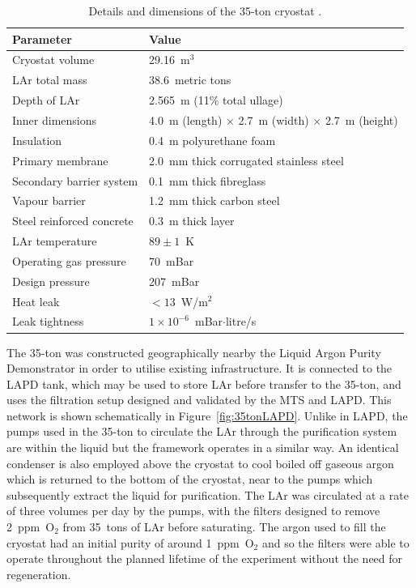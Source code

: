 \begin{table}
  \caption[Details and dimensions of the 35-ton cryostat.]{Details and dimensions of the 35-ton cryostat \cite{35tonPhaseI2015}.}
  \label{tab:35tonCryostat}
  \centering
  \begin{tabular}{ l l }
    \toprule
    Parameter & Value \\
    \midrule
    Cryostat volume           & 29.16~m$^3$ \\
    LAr total mass            & 38.6~metric tons \\
    Depth of LAr              & 2.565~m (11\% total ullage) \\
    Inner dimensions          & 4.0~m (length) $\times$ 2.7~m (width) $\times$ 2.7~m (height) \\
    Insulation                & 0.4~m polyurethane foam \\
    Primary membrane          & 2.0~mm thick corrugated stainless steel \\
    Secondary barrier system  & 0.1~mm thick fibreglass \\
    Vapour barrier             & 1.2~mm thick carbon steel \\
    Steel reinforced concrete & 0.3~m thick layer \\
    LAr temperature           & $89\pm1$~K \\
    Operating gas pressure    & 70~mBar \\
    Design pressure           & 207~mBar \\
    Heat leak                 & $<13$~W/m$^2$ \\
    Leak tightness            & $1\times10^{-6}$~mBar$\cdot$litre/s \\
    \bottomrule
  \end{tabular}
\end{table}

The 35-ton was constructed geographically nearby the Liquid Argon Purity Demonstrator in order to utilise existing infrastructure.  It is connected to the LAPD tank, which may be used to store LAr before transfer to the 35-ton, and uses the filtration setup designed and validated by the MTS and LAPD.  This network is shown schematically in Figure~\ref{fig:35tonLAPD}.  Unlike in LAPD, the pumps used in the 35-ton to circulate the LAr through the purification system are within the liquid but the framework operates in a similar way.  An identical condenser is also employed above the cryostat to cool boiled off gaseous argon which is returned to the bottom of the cryostat, near to the pumps which subsequently extract the liquid for purification.  The LAr was circulated at a rate of three volumes per day by the pumps, with the filters designed to remove 2~ppm~O$_2$ from 35~tons of LAr before saturating.  The argon used to fill the cryostat had an initial purity of around 1~ppm~O$_2$ and so the filters were able to operate throughout the planned lifetime of the experiment without the need for regeneration.

